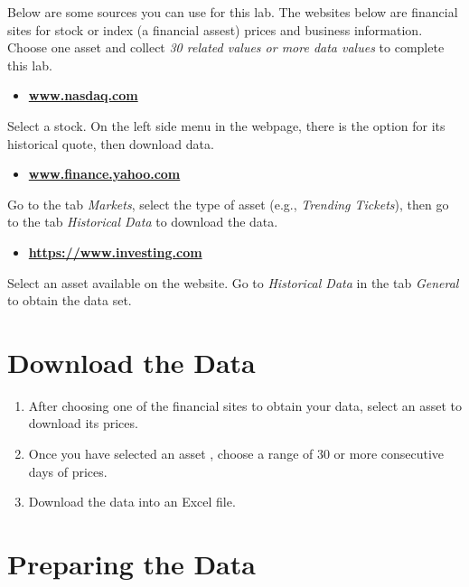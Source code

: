 \documentclass[
]{book}
\providecommand{\tightlist}{%
  \setlength{\itemsep}{0pt}\setlength{\parskip}{0pt}}
\begin{document}
Below are some sources you can use for this lab. The websites below are financial sites for stock or index (a financial assest) prices and business information. Choose one asset and collect \emph{30 related values or more data values} to complete this lab.

\begin{itemize}
\tightlist
\item
  \href{www.nasdaq.com}{\textbf{www.nasdaq.com}}
\end{itemize}

Select a stock. On the left side menu in the webpage, there is the option for its historical quote, then download data.

\begin{itemize}
\tightlist
\item
  \href{www.finance.yahoo.com}{\textbf{www.finance.yahoo.com}}
\end{itemize}

Go to the tab \emph{Markets}, select the type of asset (e.g., \emph{Trending Tickets}), then go to the tab \emph{Historical Data} to download the data.

\begin{itemize}
\tightlist
\item
  \href{https://www.investing.com}{\textbf{https://www.investing.com}}
\end{itemize}

Select an asset available on the website. Go to \emph{Historical Data} in the tab \emph{General} to obtain the data set.

\hypertarget{download-the-data}{%
\section{Download the Data}\label{download-the-data}}

\begin{enumerate}
\def\labelenumi{\arabic{enumi}.}
\tightlist
\item
  After choosing one of the financial sites to obtain your data, select an asset to download its prices.
\item
  Once you have selected an asset , choose a range of 30 or more consecutive days of prices.
\item
  Download the data into an Excel file.
\end{enumerate}

\hypertarget{preparing-the-data}{%
\section{Preparing the Data}\label{preparing-the-data}}
\end{document}
